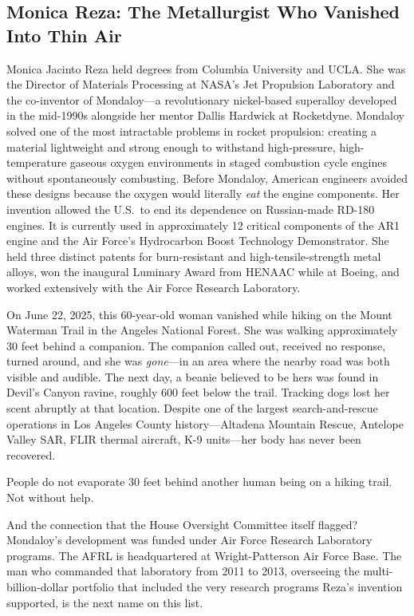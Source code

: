 \documentclass[11pt,a4paper]{article}
\begin{document}
\subsection{Monica Reza: The Metallurgist Who Vanished Into Thin Air}

Monica Jacinto Reza held degrees from Columbia University and UCLA. She was the Director of Materials Processing at NASA's Jet Propulsion Laboratory and the co-inventor of Mondaloy---a revolutionary nickel-based superalloy developed in the mid-1990s alongside her mentor Dallis Hardwick at Rocketdyne. Mondaloy solved one of the most intractable problems in rocket propulsion: creating a material lightweight and strong enough to withstand high-pressure, high-temperature gaseous oxygen environments in staged combustion cycle engines without spontaneously combusting. Before Mondaloy, American engineers avoided these designs because the oxygen would literally \textit{eat} the engine components. Her invention allowed the U.S.\ to end its dependence on Russian-made RD-180 engines. It is currently used in approximately 12 critical components of the AR1 engine and the Air Force's Hydrocarbon Boost Technology Demonstrator. She held three distinct patents for burn-resistant and high-tensile-strength metal alloys, won the inaugural Luminary Award from HENAAC while at Boeing, and worked extensively with the Air Force Research Laboratory.

On June 22, 2025, this 60-year-old woman vanished while hiking on the Mount Waterman Trail in the Angeles National Forest. She was walking approximately 30 feet behind a companion. The companion called out, received no response, turned around, and she was \textit{gone}---in an area where the nearby road was both visible and audible. The next day, a beanie believed to be hers was found in Devil's Canyon ravine, roughly 600 feet below the trail. Tracking dogs lost her scent abruptly at that location. Despite one of the largest search-and-rescue operations in Los Angeles County history---Altadena Mountain Rescue, Antelope Valley SAR, FLIR thermal aircraft, K-9 units---her body has never been recovered.

People do not evaporate 30 feet behind another human being on a hiking trail. Not without help.

And the connection that the House Oversight Committee itself flagged? Mondaloy's development was funded under Air Force Research Laboratory programs. The AFRL is headquartered at Wright-Patterson Air Force Base. The man who commanded that laboratory from 2011 to 2013, overseeing the multi-billion-dollar portfolio that included the very research programs Reza's invention supported, is the next name on this list.
\end{document}
